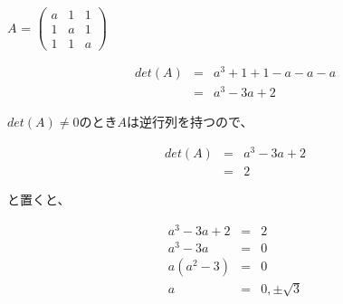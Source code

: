 \documentclass{jsarticle}
\begin{document}
    $ A $ =
    $ \begin{pmatrix}
        a & 1 & 1 \\
        1 & a & 1 \\
        1 & 1 & a
    \end{pmatrix} $

    \begin{fleqn}
        \begin{eqnarray*}
            det(A) & = & a^3 + 1 + 1 - a - a - a \\
            & = & a^3 - 3a + 2
        \end{eqnarray*}
    \end{fleqn}

    $ det(A) \neq 0 $のとき$ A $は逆行列を持つので、

    \begin{fleqn}
        \begin{eqnarray*}
            det(A) & = & a^3 - 3a + 2 \\
            & = & 2
        \end{eqnarray*}
    \end{fleqn}
    と置くと、

    \begin{fleqn}
        \begin{eqnarray*}
            a^3 - 3a + 2 & = & 2 \\
            a^3 - 3a & = & 0 \\
            a(a^2 - 3) & = & 0 \\
            a & = & 0, \pm \sqrt{3}
        \end{eqnarray*}
    \end{fleqn}
\end{document}

